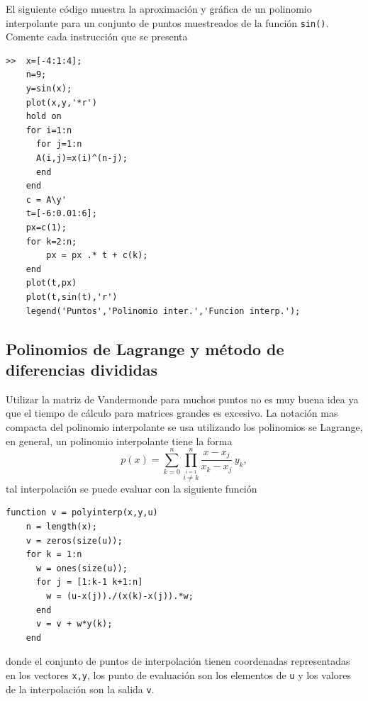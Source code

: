 \documentclass[11pt]{article}
\begin{document}
El siguiente c\'odigo muestra la aproximaci\'on y gr\'afica de un polinomio interpolante para un conjunto de puntos muestreados de la funci\'on \texttt{sin()}. Comente cada instrucci\'on que se presenta 

\begin{verbatim}
>> 	x=[-4:1:4];
	n=9;
    y=sin(x); 
    plot(x,y,'*r') 
    hold on 
    for i=1:n 
      for j=1:n 
      A(i,j)=x(i)^(n-j);  
      end 
    end 
    c = A\y' 
    t=[-6:0.01:6]; 
    px=c(1); 
    for k=2:n; 
    	px = px .* t + c(k); 
    end 
    plot(t,px)
    plot(t,sin(t),'r')
    legend('Puntos','Polinomio inter.','Funcion interp.');
\end{verbatim}


\subsection{Polinomios de Lagrange y m\'etodo de diferencias divididas}

Utilizar la matriz de Vandermonde para muchos puntos no es muy buena idea ya que el tiempo de c\'alculo para matrices grandes 
es excesivo. La notaci\'on mas compacta del polinomio interpolante se usa utilizando los polinomios se Lagrange, en general, 
un polinomio interpolante tiene la forma
$$\displaystyle
p(x)=\sum_{k=0}^{n} \prod_{\stackrel{i=1}{i\neq k}}^n \frac{x-x_j}{x_k-x_j} \, y_k,
$$
tal interpolaci\'on se puede evaluar con la siguiente funci\'on
\begin{verbatim}
function v = polyinterp(x,y,u)
    n = length(x);
    v = zeros(size(u));
    for k = 1:n
      w = ones(size(u));
      for j = [1:k-1 k+1:n]
      	w = (u-x(j))./(x(k)-x(j)).*w;
      end
      v = v + w*y(k);
    end
\end{verbatim}
donde el conjunto de puntos de interpolaci\'on tienen coordenadas representadas en los vectores \texttt{x,y}, los punto de evaluaci\'on son los elementos de \texttt{u} y los valores de la interpolaci\'on son la salida \texttt{v}.
\end{document}

